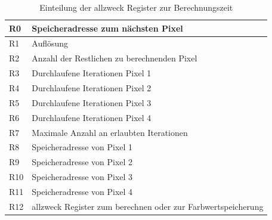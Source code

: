 \documentclass[11pt]{scrartcl}
\begin{document}
\begin{table}[!ht]
  \begin{center}
    \begin{tabular}{| l | l |}
      \hline
      R0 & Speicheradresse zum nächsten Pixel \\ \hline
      R1 & Auflösung\\ \hline
      R2 & Anzahl der Restlichen zu berechnenden Pixel \\ \hline
      R3 & Durchlaufene Iterationen Pixel 1 \\ \hline
      R4 & Durchlaufene Iterationen Pixel 2 \\ \hline
      R5 & Durchlaufene Iterationen Pixel 3 \\ \hline
      R6 & Durchlaufene Iterationen Pixel 4 \\ \hline
      R7 & Maximale Anzahl an erlaubten Iterationen \\ \hline
      R8 & Speicheradresse von Pixel 1 \\ \hline
      R9 & Speicheradresse von Pixel 2 \\ \hline
      R10 & Speicheradresse von Pixel 3 \\ \hline
      R11 & Speicheradresse von Pixel 4 \\ \hline
      R12 & allzweck Register zum berechnen oder zur Farbwertspeicherung \\ \hline
    \end{tabular}
  \end{center}

  \caption{Einteilung der allzweck Register zur Berechnungszeit}
  \label{tbl: Allg}
\end{table}
\end{document}
